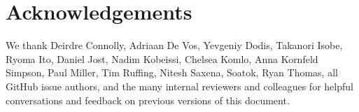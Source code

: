 \section{Acknowledgements}
We thank Deirdre Connolly, Adriaan De Vos, Yevgeniy Dodis, Takanori Isobe, Ryoma Ito, Daniel Jost, Nadim
Kobeissi, Chelsea Komlo, Anna Kornfeld Simpson, Paul Miller, Tim Ruffing, Nitesh Saxena, Soatok,
Ryan Thomas, all GitHub issue authors, and the many internal reviewers and colleagues for helpful
conversations and feedback on previous versions of this document.